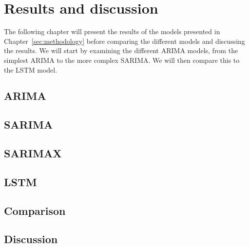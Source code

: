 \section{Results and discussion}\label{sec:results}
The following chapter will present the results of the models presented in Chapter~\ref{sec:methodology} before comparing the different models and discussing the results. We will start by examining the different ARIMA models, from the simplest ARIMA to the more complex SARIMA. We will then compare this to the LSTM model. 

\subsection{ARIMA}\label{sec:arima}

\subsection{SARIMA}\label{sec:sarima}

\subsection{SARIMAX}\label{sec:sarimax}

\subsection{LSTM}\label{sec:lstm}

\subsection{Comparison}\label{sec:comparison}

\subsection{Discussion}\label{sec:discussion}
